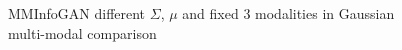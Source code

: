 \documentclass[letterpaper,12pt]{article}
\begin{document}
\begin{figure}[H]
    \hspace{10px}

    \caption{MMInfoGAN different $\Sigma$, $\mu$ and fixed 3 modalities in Gaussian multi-modal comparison}
\end{figure}
\end{document}
